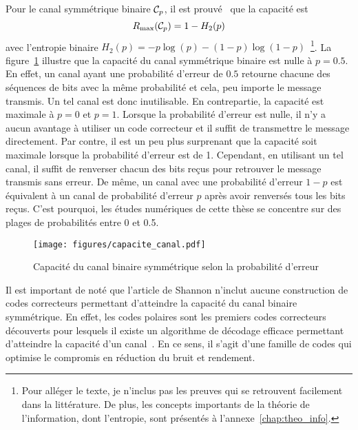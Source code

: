 Pour le canal symmétrique binaire $\mathcal{C}_p$, 
il est prouvé~\cite{shannon_mathematical_1948} que la capacité est 
\begin{equation}
  R_{\text{max}}(\mathcal{C}_p) = 1 - H_2(p)
\end{equation}
avec l'entropie binaire $H_2(p) = -p \log(p) - (1 - p)\log(1 - p)$~\footnote{
  Pour alléger le texte, je n'inclus pas les preuves qui se retrouvent facilement 
  dans la littérature.
  De plus, les concepts importants de la théorie de l'information, dont l'entropie, 
  sont présentés à l'annexe~\ref{chap:theo_info}.
}. 
La figure~\ref{fig:capacite_canal} illustre que la capacité du canal symmétrique binaire 
est nulle à $p = 0.5$.
En effet, un canal ayant une probabilité d'erreur de $0.5$ retourne 
chacune des séquences de bits avec la même probabilité 
et cela, peu importe le message transmis.
Un tel canal est donc inutilisable.
En contrepartie, la capacité est maximale à $p = 0$ et $p = 1$.
Lorsque la probabilité d'erreur est nulle,
il n'y a aucun avantage à utiliser un code correcteur 
et il suffit de transmettre le message directement.
Par contre, il est un peu plus surprenant que la capacité soit maximale lorsque la probabilité
d'erreur est de 1.
Cependant, en utilisant un tel canal, 
il suffit de renverser chacun des bits reçus pour retrouver le message transmis sans erreur.
De même, 
un canal avec une probabilité d'erreur $1 - p$ est équivalent à un canal de probabilité d'erreur $p$
après avoir renversés tous les bits reçus.
C'est pourquoi, 
les études numériques de cette thèse se concentre sur des plages de probabilités entre 0 et 0.5.

\begin{figure}
  \begin{center}
    \texttt{[image: figures/capacite\_canal.pdf]}
  \end{center}
  \caption{Capacité du canal binaire symmétrique selon la probabilité d'erreur}
  \label{fig:capacite_canal}
\end{figure}

Il est important de noté que l'article de Shannon n'inclut aucune construction de codes 
correcteurs permettant d'atteindre la capacité du canal binaire symmétrique.
En effet, les codes polaires sont les premiers codes correcteurs découverts 
pour lesquels il existe un algorithme de décodage efficace permettant d'atteindre 
la capacité d'un canal~\cite{arikan_channel_2009}. 
En ce sens, il s'agit d'une famille de codes qui optimise le compromis en réduction du bruit 
et rendement.

